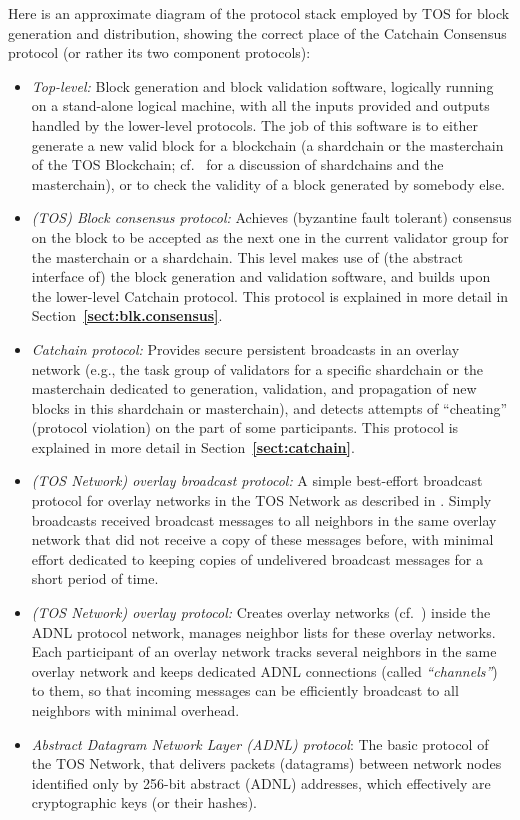 \documentclass[12pt,oneside]{article}
\def\refpoint#1{{\rm\textbf{\ref{#1}}}}
\let\ptref=\refpoint
\begin{document}
Here is an approximate diagram of the protocol stack employed by TOS for block generation and distribution, showing the correct place of the Catchain Consensus protocol (or rather its two component protocols):
\begin{itemize}
\item {\it Top-level:} Block generation and block validation software, logically running on a stand-alone logical machine, with all the inputs provided and outputs handled by the lower-level protocols. The job of this software is to either generate a new valid block for a blockchain (a shardchain or the masterchain of the TOS Blockchain; cf.~\cite{TOS} for a discussion of shardchains and the masterchain), or to check the validity of a block generated by somebody else.
\item {\it (TOS) Block consensus protocol:\/} Achieves (byzantine fault tolerant) consensus on the block to be accepted as the next one in the current validator group for the masterchain or a shardchain. This level makes use of (the abstract interface of) the block generation and validation software, and builds upon the lower-level Catchain protocol. This protocol is explained in more detail in Section~\ptref{sect:blk.consensus}.
\item {\it Catchain protocol:\/} Provides secure persistent broadcasts in an overlay network (e.g., the task group of validators for a specific shardchain or the masterchain dedicated to generation, validation, and propagation of new blocks in this shardchain or masterchain), and detects attempts of ``cheating'' (protocol violation) on the part of some participants. This protocol is explained in more detail in Section~\ptref{sect:catchain}.
\item {\it (TOS Network) overlay broadcast protocol:\/} A simple best-effort broadcast protocol for overlay networks in the TOS Network as described in \cite{TOS}. Simply broadcasts received broadcast messages to all neighbors in the same overlay network that did not receive a copy of these messages before, with minimal effort dedicated to keeping copies of undelivered broadcast messages for a short period of time.
\item {\it (TOS Network) overlay protocol:\/} Creates overlay networks (cf.~\cite{TOS}) inside the ADNL protocol network, manages neighbor lists for these overlay networks. Each participant of an overlay network tracks several neighbors in the same overlay network and keeps dedicated ADNL connections (called {\em ``channels''\/}) to them, so that incoming messages can be efficiently broadcast to all neighbors with minimal overhead.
\item {\it Abstract Datagram Network Layer (ADNL) protocol\/}: The basic protocol of the TOS Network, that delivers packets (datagrams) between network nodes identified only by 256-bit abstract (ADNL) addresses, which effectively are cryptographic keys (or their hashes).
\end{itemize}
\end{document}

